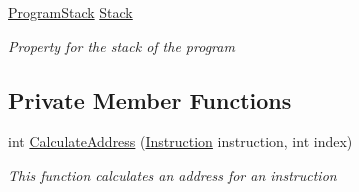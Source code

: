 \begin{DoxyCompactItemize}
\hyperlink{class_c_p_u___o_s___simulator_1_1_c_p_u_1_1_program_stack}{Program\+Stack} \hyperlink{class_c_p_u___o_s___simulator_1_1_c_p_u_1_1_simulator_program_ac6065e57e8d108a0aefd27840f3bf01c}{Stack}
\begin{DoxyCompactList}\small\item\em Property for the stack of the program \end{DoxyCompactList}\end{DoxyCompactItemize}
\subsection*{Private Member Functions}
\begin{DoxyCompactItemize}
\item 
int \hyperlink{class_c_p_u___o_s___simulator_1_1_c_p_u_1_1_simulator_program_a6ab84d4093d03fc387e4288dfc566388}{Calculate\+Address} (\hyperlink{class_c_p_u___o_s___simulator_1_1_c_p_u_1_1_instruction}{Instruction} instruction, int index)
\begin{DoxyCompactList}\small\item\em This function calculates an address for an instruction \end{DoxyCompactList}\end{DoxyCompactItemize}
